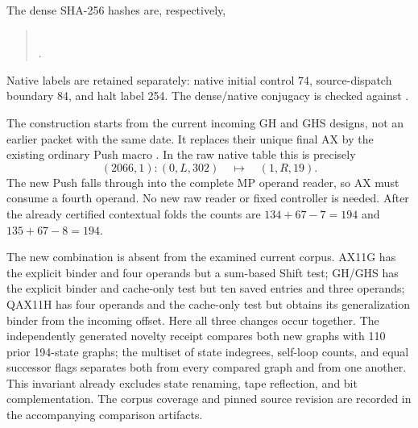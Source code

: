 \documentclass[11pt,a4paper]{article}
\newcommand{\file}[1]{\texttt{\path{#1}}}
\begin{document}
The dense SHA-256 hashes are, respectively,
\begin{quote}\small
{}\\
.
\end{quote}
Native labels are retained separately: native initial control 74,
source-dispatch boundary 84, and halt label 254. The dense/native
conjugacy is checked against \file{labels.json}.

The construction starts from the current incoming GH and GHS designs,
not an earlier packet with the same date. It replaces their unique final
AX \file{breakTo 1} by the existing ordinary Push macro
\file{node49}. In the raw native table this is precisely
\[
 (2066,1):(0,L,302)\quad\longmapsto\quad(1,R,19).
\]
The new Push falls through into the complete MP operand reader, so AX
must consume a fourth operand. No new raw reader or fixed controller is
needed. After the already certified contextual folds the counts are
$134+67-7=194$ and $135+67-8=194$.

The new combination is absent from the examined current corpus.
AX11G has the explicit binder and four operands but a sum-based Shift
test; GH/GHS has the explicit binder and cache-only test but ten saved
entries and three operands; QAX11H has four operands and the cache-only
test but obtains its generalization binder from the incoming offset.
Here all three changes occur together. The independently generated
novelty receipt compares both new graphs with 110 prior 194-state
graphs; the multiset of state indegrees, self-loop counts, and equal
successor flags separates both from every compared graph and from one
another. This invariant already excludes state renaming, tape reflection,
and bit complementation. The corpus coverage and pinned source revision
are recorded in the accompanying comparison artifacts.
\end{document}
